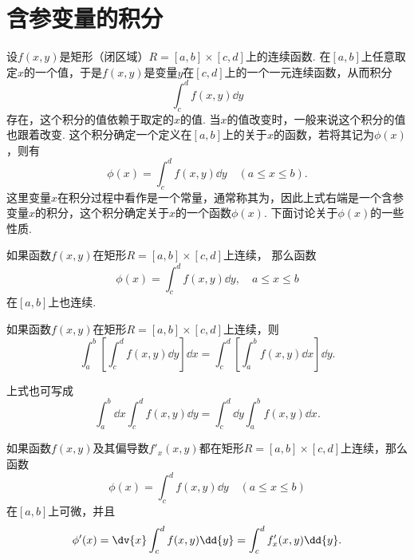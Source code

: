 \section{含参变量的积分}
设\(f(x,y)\)是矩形（闭区域）\(R = [a,b]\times[c,d]\)上的连续函数.
在\([a,b]\)上任意取定\(x\)的一个值，于是\(f(x,y)\)是变量\(y\)在\([c,d]\)上的一个一元连续函数，从而积分\begin{equation*}
\int_c^d f(x,y) \dd{y}
\end{equation*}存在，这个积分的值依赖于取定的\(x\)的值.
当\(x\)的值改变时，一般来说这个积分的值也跟着改变.
这个积分确定一个定义在\([a,b]\)上的关于\(x\)的函数，若将其记为\(\phi(x)\)，则有\begin{equation*}
\phi(x) = \int_c^d f(x,y) \dd{y}
\quad(a \leq x \leq b).
\end{equation*}这里变量\(x\)在积分过程中看作是一个常量，通常称其为，因此上式右端是一个含参变量\(x\)的积分，这个积分确定关于\(x\)的一个函数\(\phi(x)\).
下面讨论关于\(\phi(x)\)的一些性质.

\begin{theorem}
如果函数\(f(x,y)\)在矩形\(R=[a,b]\times[c,d]\)上连续，
那么函数\begin{equation*}
\phi(x) = \int_c^d{f(x,y)\dd{y}}, \quad a \leq x \leq b
\end{equation*}在\([a,b]\)上也连续.
\end{theorem}

\begin{theorem}
如果函数\(f(x,y)\)在矩形\(R=[a,b]\times[c,d]\)上连续，则\begin{equation*}
\int_a^b\left[\int_c^d f(x,y) \dd{y}\right] \dd{x}
=\int_c^d\left[\int_a^b f(x,y) \dd{x}\right] \dd{y}.
\end{equation*}
\end{theorem}
上式也可写成\begin{equation*}
\int_a^b \dd{x} \int_c^d f(x,y) \dd{y}
=\int_c^d \dd{y} \int_a^b f(x,y) \dd{x}.
\end{equation*}

\begin{theorem}
如果函数\(f(x,y)\)及其偏导数\(f'_x(x,y)\)都在矩形\(R=[a,b]\times[c,d]\)上连续，那么函数\begin{equation*}
\phi(x) = \int_c^d f(x,y) \dd{y}
\quad(a \leq x \leq b)
\end{equation*}在\([a,b]\)上可微，并且\begin{equation*}
\phi'(x) = \dv{x} \int_c^d f(x,y) \dd{y}
= \int_c^d f'_x(x,y) \dd{y}.
\end{equation*}
\end{theorem}

